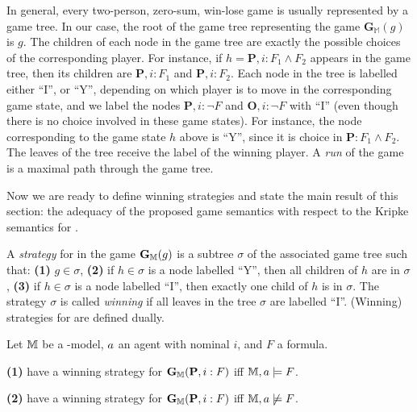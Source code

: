 In general, every two-person, zero-sum, win-lose game is usually represented by
a game tree. In our
case, the root of the game tree representing the game
$\mathbf{G}_\mathbb{M}(g)$ is $g$. The children of each node in the game tree
are exactly the possible choices of the corresponding player. For instance, if
$h=\mathbf{P},  i :  F _1\wedge  F _2$ appears in the game tree, then its
children are $\mathbf{P}, i : F _1$ and $\mathbf{P}, i : F _2$. Each node in
the tree is labelled either ``I'', or ``Y'', depending on which player is to
move in the corresponding game state, and we label 
the nodes  $\mathbf{P},  i : \neg  F $ and $\mathbf{O},  i :
\neg  F $ with ``I'' (even though there is no choice involved in these game
states). For instance, the node corresponding to the game state $h$ above is
``Y'', since it is \Your choice in $\mathbf{P}: F _1\wedge  F _2$. The leaves
of the tree receive the label of the winning player. 
A \emph{run} of the game is a maximal path through the game tree.

Now we are ready to define winning strategies and state the main result of this section:
the adequacy of the proposed game semantics with respect to the Kripke semantics for \PNL.

\begin{definition}
    A \emph{strategy} for \Me in the game $\mathbf{G}_{\mathbb{M}}(g)$ is a subtree $\sigma$ of the associated game tree such that: 
 \textbf{(1)} $g\in \sigma$,
 \textbf{(2)} if $h\in \sigma$ is a node labelled ``Y'', then all children of $h$ are in $\sigma$,
 \textbf{(3)} if $h\in \sigma$ is a node labelled ``I'', then exactly one child of $h$ is in $\sigma$.
The strategy $\sigma$ is called \emph{winning} if all leaves in the tree $\sigma$ are labelled ``I''. (Winning) strategies for \You are defined dually.
\end{definition}

\begin{theorem}%
\label{th:adequacy}
Let $\mathbb{M}$ be a \PNL-model, $\ag$ an agent with nominal $i$, and $F$ a formula.

\noindent\textbf{(1)} \Ic have a winning strategy for $\mathbf{G}_{\mathbb{M}}(\mathbf{P}, i:F)$ iff $\M,\ag \models F$. 

\noindent\textbf{(2)} \You have a winning strategy for $\mathbf{G}_{\mathbb{M}}(\mathbf{P}, i:F)$ iff $\M,\ag\not \models F$.
\end{theorem}

